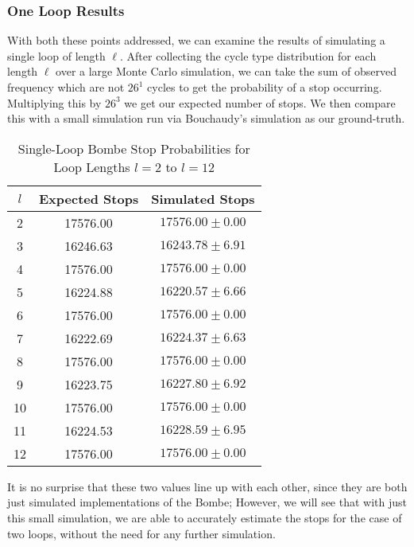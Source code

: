 \subsubsection{One Loop Results}
With both these points addressed, we can examine the results of
simulating a single loop of length $\ell$. After collecting the cycle
type distribution for each length $\ell$ over a large Monte Carlo
simulation, we can take the sum of observed frequency which are not
$26^1$ cycles to get the probability of a stop occurring. Multiplying this
by $26^3$ we get our expected number of stops. We then compare this
with a small simulation run via Bouchaudy's simulation as our ground-truth.
\begin{table}[H]
  \centering

  \begin{tabular}{|c|c|c|}
    \hline
    {\bf{ $l$ }} & {\bf{ Expected Stops }} & {\bf{ Simulated Stops }}\\
    \hline
    2 & 17576.00 & $17576.00 \pm 0.00$\\
    \hline
    3 & 16246.63 & $16243.78 \pm 6.91$\\
    \hline
    4 & 17576.00 & $17576.00 \pm 0.00$\\
    \hline
    5 & 16224.88 & $16220.57 \pm 6.66$\\
    \hline
    6 & 17576.00 & $17576.00 \pm 0.00$\\
    \hline
    7 & 16222.69 & $16224.37 \pm 6.63$\\
    \hline
    8 & 17576.00 & $17576.00 \pm 0.00$\\
    \hline
    9 & 16223.75 & $16227.80 \pm 6.92$\\
    \hline
    10 & 17576.00 & $17576.00 \pm 0.00$\\
    \hline
    11 & 16224.53 & $16228.59 \pm 6.95$\\
    \hline
    12 & 17576.00 & $17576.00 \pm 0.00$\\
    \hline
  \end{tabular}
  \caption{Single-Loop Bombe Stop Probabilities for Loop Lengths
  $l=2$ to $l=12$}
\end{table}
\noindent It is no surprise that these two values line up with each
other, since they are both just simulated implementations of the
Bombe; However, we will see that with just this small simulation, we are
able to accurately estimate the stops for the case of two loops,
without the need for any further simulation.
